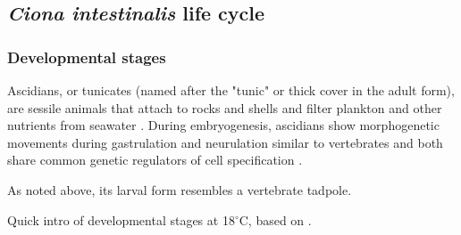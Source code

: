 \subsection{\textit{Ciona intestinalis} life cycle}


\subsubsection{Developmental stages}

Ascidians, or tunicates (named after the "tunic" or thick cover in the adult form), are sessile animals that  attach to rocks and shells and filter plankton and other nutrients from seawater \citep{satoh2014developmental}.
During embryogenesis, ascidians show morphogenetic movements during gastrulation and neurulation similar to vertebrates and both share common genetic regulators of cell specification \citep{Satoh2003}.

As noted above, its larval form resembles a vertebrate tadpole.


Quick intro of developmental stages at 18$^\circ$C, based on \citep{Hotta2007}.

